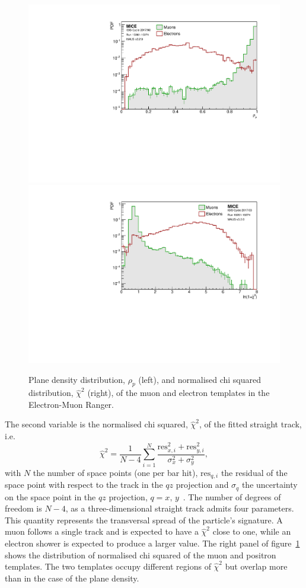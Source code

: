 \begin{figure}[htb!]
	\begin{center}
		\includegraphics[width=0.49\columnwidth]{rhop.pdf}
		\hfill
		\includegraphics[width=0.49\columnwidth]{chi2.pdf}
		\caption{Plane density distribution, $\rho_p$ (left), and normalised chi squared distribution, $\hat{\chi}^2$ (right), of the muon and electron templates in the Electron-Muon Ranger.}
		\label{fig:emr_pid_variables}
	\end{center}
\end{figure}

The second variable is the normalised chi squared, $\hat{\chi}^2$, of the fitted straight track, i.e.
\begin{equation}
\hat{\chi}^2=\frac{1}{N-4}\sum_{i=1}^{N}\frac{\text{res}_{x,i}^2+\text{res}_{y,i}^2}{\sigma_x^2+\sigma_y^2},
\end{equation}
with $N$ the number of space points (one per bar hit), $\text{res}_{q,i}$ the residual of the space point with respect to the track in the $qz$ projection and $\sigma_q$ the uncertainty on the space point in the $qz$ projection, $q=x,\,y$~\cite{Drielsma:thesis}. The number of degrees of freedom is $N-4$, as a three-dimensional straight track admits four parameters. This quantity represents the transversal spread of the particle's signature. A muon follows a single track and is expected to have a $\hat{\chi}^2$ close to one, while an electron shower is expected to produce a larger value. The right panel of figure~\ref{fig:emr_pid_variables} shows the distribution of normalised chi squared of the muon and positron templates. The two templates occupy different regions of $\hat{\chi}^2$ but overlap more than in the case of the plane density.

